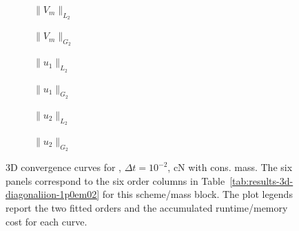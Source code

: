 \begin{figure}[p]
\centering
\begin{subfigure}{0.485\linewidth}
\centering
{}
\caption{$\|V_m\|_{L_2}$}
\label{fig:results-3d-diagonaliion-1p0em02-cranknicolson-consistent-a}
\end{subfigure}
\hfill
\begin{subfigure}{0.485\linewidth}
\centering
{}
\caption{$\|V_m\|_{G_2}$}
\label{fig:results-3d-diagonaliion-1p0em02-cranknicolson-consistent-b}
\end{subfigure}
\par\vspace{0.8em}
\begin{subfigure}{0.485\linewidth}
\centering
{}
\caption{$\|u_1\|_{L_2}$}
\label{fig:results-3d-diagonaliion-1p0em02-cranknicolson-consistent-c}
\end{subfigure}
\hfill
\begin{subfigure}{0.485\linewidth}
\centering
{}
\caption{$\|u_1\|_{G_2}$}
\label{fig:results-3d-diagonaliion-1p0em02-cranknicolson-consistent-d}
\end{subfigure}
\par\vspace{0.8em}
\begin{subfigure}{0.485\linewidth}
\centering
{}
\caption{$\|u_2\|_{L_2}$}
\label{fig:results-3d-diagonaliion-1p0em02-cranknicolson-consistent-e}
\end{subfigure}
\hfill
\begin{subfigure}{0.485\linewidth}
\centering
{}
\caption{$\|u_2\|_{G_2}$}
\label{fig:results-3d-diagonaliion-1p0em02-cranknicolson-consistent-f}
\end{subfigure}
\caption{3D convergence curves for , $\Delta t=10^{-2}$, cN with cons. mass. The six panels correspond to the six order columns in Table~\ref{tab:results-3d-diagonaliion-1p0em02} for this scheme/mass block. The plot legends report the two fitted orders and the accumulated runtime/memory cost for each curve.}
\label{fig:results-3d-diagonaliion-1p0em02-cranknicolson-consistent}
\end{figure}
\FloatBarrier

